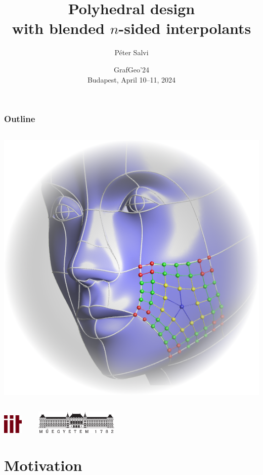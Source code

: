 \documentclass{beamer}
\title{Polyhedral design\\with blended $n$-sided interpolants}
\author{P\'eter Salvi}
\institute{Budapest University of Technology and Economics}
\date{GrafGeo'24\\\vspace{1em}Budapest, April 10--11, 2024}
\begin{document}
\begin{frame}
  \titlepage
\end{frame}

\begin{frame}
  \frametitle{Outline}
  \begin{columns}
    \tableofcontents
    \centering
    \includegraphics[width=\textwidth]{images/face-gradient.png}\\\vspace{1em}
  \end{columns}
  \centering
  \includegraphics[height=2.5em]{images/iit.png}$\qquad$
  \includegraphics[height=3em]{images/bme.jpg}
\end{frame}

\section{Motivation}
\end{document}
